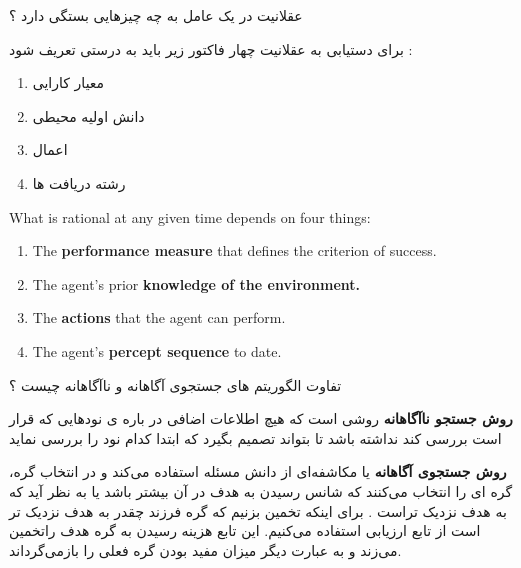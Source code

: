 \documentclass[12pt]{article}
\begin{document}
\newpage

\noindent
عقلانیت در یک عامل به چه چیزهایی بستگی دارد ؟

\vspace{10pt}

\begin{tcolorbox}
\noindent
برای دستیابی به عقلانیت چهار فاکتور زیر باید به درستی تعریف شود :

\begin{enumerate}
	\item معیار کارایی
	\item دانش اولیه محیطی
	\item اعمال
	\item رشته دریافت ها
\end{enumerate}
\end{tcolorbox}


\begin{latin}
\begin{tcolorbox}
\noindent
What is rational at any given time depends on four things:

\begin{enumerate}
	\item The \textbf{performance measure} that defines the criterion of success.
	\item The agent’s prior \textbf{knowledge of the environment.}
	\item The \textbf{actions} that the agent can perform.
	\item The agent’s \textbf{percept sequence} to date.
\end{enumerate}
\end{tcolorbox}
\end{latin}


\vspace{30pt}


\noindent
تفاوت الگوریتم های جستجوی آگاهانه و ناآگاهانه چیست ؟

\vspace{10pt}

\begin{tcolorbox}
\textbf{ روش جستجو ناآگاهانه }
 روشی است که هیچ اطلاعات اضافی در باره ی نودهایی که قرار است بررسی کند نداشته باشد تا بتواند تصمیم بگیرد که ابتدا کدام نود را بررسی نماید
 
 \textbf{ روش جستجوی آگاهانه }
 یا مکاشفه‌ای از دانش مسئله استفاده می‌کند و در انتخاب گره، گره ای را انتخاب می‌کنند که شانس رسیدن به هدف در آن بیشتر باشد یا به نظر آید که به هدف نزدیک تراست . برای اینکه تخمین بزنیم که گره فرزند چقدر به هدف نزدیک تر است از تابع ارزیابی استفاده می‌کنیم. این تابع هزینه رسیدن به گره هدف راتخمین می‌زند و به عبارت دیگر میزان مفید بودن گره فعلی را بازمی‌گرداند. 
\end{tcolorbox}
\end{document}
